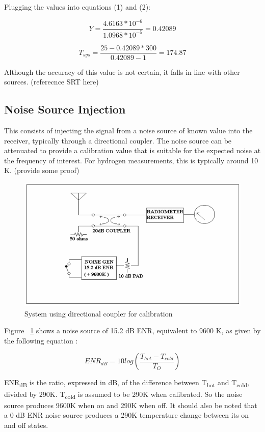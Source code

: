 \documentclass[letterpaper, 12pt]{article}
\begin{document}
Plugging the values into equations (1) and (2):

$$Y = \frac{4.6163 * 10^{-6}}{1.0968 * 10^{-5}} = 0.42089 $$

$$T_{sys} = \frac{25 - 0.42089 * 300}{0.42089 - 1} = 174.87$$

Although the accuracy of this value is not certain, it falls in line with other sources. {\color{red}(referecnce SRT here)}

\subsection{Noise Source Injection}
This consists of injecting the signal from a noise source of known value into the receiver, typically through a directional coupler. The noise source can be attenuated to provide a calibration value that is suitable for the expected noise at the frequency of interest. For hydrogen measurements, this is typically around 10 K. {\color{red}(provide some proof)}  

\begin{figure}[h!]
	\centering
	\includegraphics[scale=0.5]{dir_coupler.png}
	\caption{System using directional coupler for calibration}
	\label{coupler}
\end{figure}

Figure ~\ref{coupler} \cite{DCOUP} shows a noise source of 15.2 dB ENR, equivalent to 9600 K, as given by the following equation \cite{AN571}:

\begin{equation}
ENR_{dB} = 10 log (\frac{T_{hot} - T_{cold}}{T_{O}})
\end{equation}


ENR\textsubscript{dB} is the ratio, expressed in dB, of the difference between T\textsubscript{hot} and T\textsubscript{cold}, divided by 290K. T\textsubscript{cold} is assumed to be 290K when calibrated. So the noise source produces 9600K when on and 290K when off. It should also be noted that a 0 dB ENR noise source produces a 290K temperature change between its on and off states.
\end{document}
